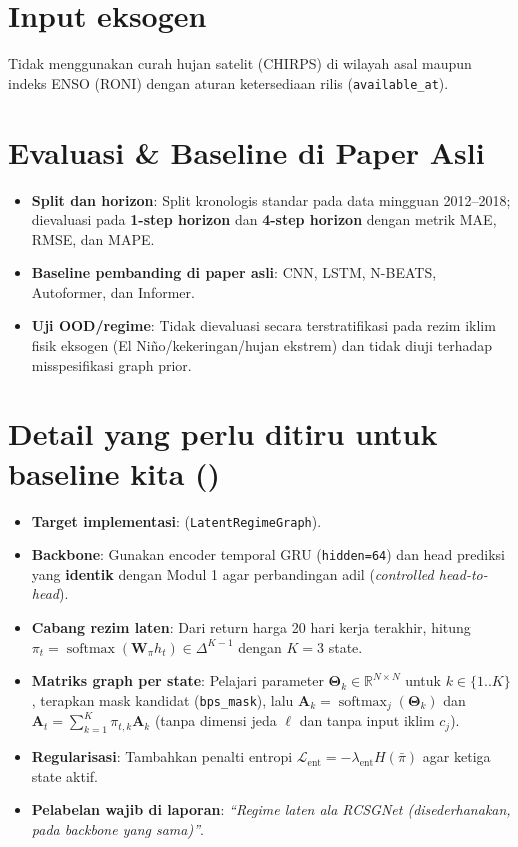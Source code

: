 \documentclass[11pt,a4paper]{article}
\begin{document}
\section{Input eksogen}
Tidak menggunakan curah hujan satelit (CHIRPS) di wilayah asal maupun indeks ENSO (RONI) dengan aturan ketersediaan rilis (\texttt{available\_at}).

\section{Evaluasi \& Baseline di Paper Asli}
\begin{itemize}
  \item \textbf{Split dan horizon}: Split kronologis standar pada data mingguan 2012--2018; dievaluasi pada \textbf{1-step horizon} dan \textbf{4-step horizon} dengan metrik MAE, RMSE, dan MAPE.
  \item \textbf{Baseline pembanding di paper asli}: CNN, LSTM, N-BEATS, Autoformer, dan Informer.
  \item \textbf{Uji OOD/regime}: Tidak dievaluasi secara terstratifikasi pada rezim iklim fisik eksogen (El Ni\~no/kekeringan/hujan ekstrem) dan tidak diuji terhadap misspesifikasi graph prior.
\end{itemize}

\section{Detail yang perlu ditiru untuk baseline kita ()}
\begin{itemize}
  \item \textbf{Target implementasi}:  (\texttt{LatentRegimeGraph}).
  \item \textbf{Backbone}: Gunakan encoder temporal GRU (\texttt{hidden=64}) dan head prediksi yang \textbf{identik} dengan Modul 1 agar perbandingan adil (\emph{controlled head-to-head}).
  \item \textbf{Cabang rezim laten}: Dari return harga 20 hari kerja terakhir, hitung $\pi_t = \operatorname{softmax}(\mathbf{W}_\pi h_t) \in \Delta^{K-1}$ dengan $K = 3$ state.
  \item \textbf{Matriks graph per state}: Pelajari parameter $\mathbf{\Theta}_k \in \mathbb{R}^{N \times N}$ untuk $k \in \{1..K\}$, terapkan mask kandidat (\texttt{bps\_mask}), lalu $\mathbf{A}_k = \operatorname{softmax}_j(\mathbf{\Theta}_k)$ dan $\mathbf{A}_t = \sum_{k=1}^K \pi_{t,k}\mathbf{A}_k$ (tanpa dimensi jeda $\ell$ dan tanpa input iklim $c_j$).
  \item \textbf{Regularisasi}: Tambahkan penalti entropi $\mathcal{L}_{\text{ent}} = -\lambda_{\text{ent}} H(\bar{\pi})$ agar ketiga state aktif.
  \item \textbf{Pelabelan wajib di laporan}: \emph{``Regime laten ala RCSGNet (disederhanakan, pada backbone yang sama)''}.
\end{itemize}
\end{document}
